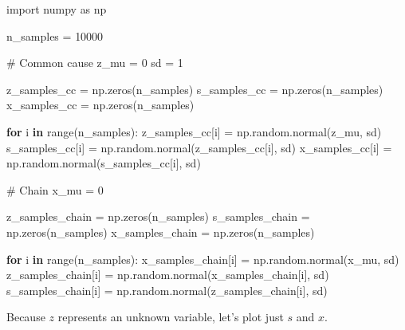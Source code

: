 \documentclass[
  letterpaper,
  DIV=11,
  numbers=noendperiod]{scrreprt}
\newenvironment{Shaded}{\begin{snugshade}}{\end{snugshade}}
\newcommand{\BuiltInTok}[1]{\textcolor[rgb]{0.00,0.23,0.31}{#1}}
\newcommand{\CommentTok}[1]{\textcolor[rgb]{0.37,0.37,0.37}{#1}}
\newcommand{\ControlFlowTok}[1]{\textcolor[rgb]{0.00,0.23,0.31}{\textbf{#1}}}
\newcommand{\DecValTok}[1]{\textcolor[rgb]{0.68,0.00,0.00}{#1}}
\newcommand{\ImportTok}[1]{\textcolor[rgb]{0.00,0.46,0.62}{#1}}
\newcommand{\KeywordTok}[1]{\textcolor[rgb]{0.00,0.23,0.31}{\textbf{#1}}}
\newcommand{\NormalTok}[1]{\textcolor[rgb]{0.00,0.23,0.31}{#1}}
\newcommand{\OperatorTok}[1]{\textcolor[rgb]{0.37,0.37,0.37}{#1}}
\begin{document}
\begin{Shaded}
\begin{Highlighting}[]
\ImportTok{import}\NormalTok{ numpy }\ImportTok{as}\NormalTok{ np}

\NormalTok{n\_samples }\OperatorTok{=} \DecValTok{10000}

\CommentTok{\# Common cause}
\NormalTok{z\_mu }\OperatorTok{=} \DecValTok{0}
\NormalTok{sd }\OperatorTok{=} \DecValTok{1}

\NormalTok{z\_samples\_cc }\OperatorTok{=}\NormalTok{ np.zeros(n\_samples)}
\NormalTok{s\_samples\_cc }\OperatorTok{=}\NormalTok{ np.zeros(n\_samples)}
\NormalTok{x\_samples\_cc }\OperatorTok{=}\NormalTok{ np.zeros(n\_samples)}

\ControlFlowTok{for}\NormalTok{ i }\KeywordTok{in} \BuiltInTok{range}\NormalTok{(n\_samples):}
\NormalTok{  z\_samples\_cc[i] }\OperatorTok{=}\NormalTok{ np.random.normal(z\_mu, sd)}
\NormalTok{  s\_samples\_cc[i] }\OperatorTok{=}\NormalTok{ np.random.normal(z\_samples\_cc[i], sd)}
\NormalTok{  x\_samples\_cc[i] }\OperatorTok{=}\NormalTok{ np.random.normal(s\_samples\_cc[i], sd)}

\CommentTok{\# Chain}
\NormalTok{x\_mu }\OperatorTok{=} \DecValTok{0}

\NormalTok{z\_samples\_chain }\OperatorTok{=}\NormalTok{ np.zeros(n\_samples)}
\NormalTok{s\_samples\_chain }\OperatorTok{=}\NormalTok{ np.zeros(n\_samples)}
\NormalTok{x\_samples\_chain }\OperatorTok{=}\NormalTok{ np.zeros(n\_samples)}

\ControlFlowTok{for}\NormalTok{ i }\KeywordTok{in} \BuiltInTok{range}\NormalTok{(n\_samples):}
\NormalTok{  x\_samples\_chain[i] }\OperatorTok{=}\NormalTok{ np.random.normal(x\_mu, sd)}
\NormalTok{  z\_samples\_chain[i] }\OperatorTok{=}\NormalTok{ np.random.normal(x\_samples\_chain[i], sd)}
\NormalTok{  s\_samples\_chain[i] }\OperatorTok{=}\NormalTok{ np.random.normal(z\_samples\_chain[i], sd)}
\end{Highlighting}
\end{Shaded}

Because \(z\) represents an unknown variable, let's plot just \(s\) and
\(x\).
\end{document}
